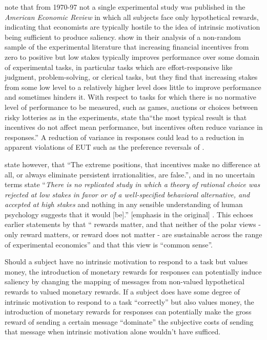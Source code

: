 \documentclass[../main.tex]{subfiles}
\begin{document}
\textcite[31]{Camerer1999} note that from 1970-97 not a single experimental study was published in the \textit{American Economic Review} in which all subjects face only hypothetical rewards, indicating that economists are typically hostile to the idea of intrinsic motivation being sufficient to produce saliency.
\textcite{Camerer1999} show in their analysis of a non-random sample of the experimental literature that increasing financial incentives from zero to positive but low stakes typically improves performance over some domain of experimental tasks, in particular tasks which are effort-responsive like judgment, problem-solving, or clerical tasks, but they find that increasing stakes from some low level to a relatively higher level does little to improve performance and sometimes hinders it.
With respect to tasks for which there is no normative level of performance to be measured, such as games, auctions or choices between risky lotteries as in the \textcite{Grether1979} experiments, \textcite[34]{Camerer1999} state tha\enquote{the most typical result is that incentives do not affect mean performance, but incentives often reduce variance in responses.}
A reduction of variance in responses could lead to a reduction in apparent violations of EUT such as the preference reversals of \textcite{Grether1979}.

\textcite[8]{Camerer1999} state however, that \enquote{The extreme positions, that  incentives make no difference at all, or always eliminate persistent irrationalities, are false.}, and in no uncertain terms state \enquote{\textit{There is no replicated study in which a theory of rational choice was rejected at low stakes in favor or of a well-specified behavioral alternative, and accepted at high stakes} \textelp{} and nothing in any sensible understanding of human psychology suggests that it would [be].} [emphasis in the original] \parencite*[33-34]{Camerer1999}.
This echoes earlier statements by \textcite[246]{Smith1993} that \enquote{\textelp{} rewards matter, and that neither of the polar views - only reward matters, or reward does not matter - are sustainable across the range of experimental economics} and that this view is \enquote{common sense}.

Should a subject have no intrinsic motivation to respond to a task but values money, the introduction of monetary rewards for responses can potentially induce saliency by changing the mapping of messages from non-valued hypothetical rewards to valued monetary rewards.
If a subject does have some degree of intrinsic motivation to respond to a task \enquote{correctly} but also values money, the introduction of monetary rewards for responses can potentially make the gross reward of sending a certain message \enquote{dominate} the subjective costs of sending that message when intrinsic motivation alone wouldn't have sufficed.
\end{document}

